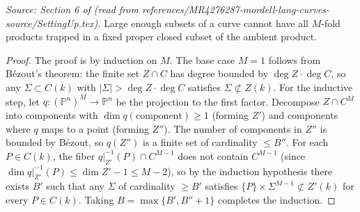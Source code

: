 \begin{lemma}
  \label{lem:NAlon}
  \textit{Source: Section 6 of \cite{MR4276287-mordell-lang-curves} (read from references/MR4276287-mordell-lang-curves-source/SettingUp.tex).}
  Large enough subsets of a curve cannot have all \(M\)-fold products trapped in
  a fixed proper closed subset of the ambient product.
\end{lemma}

\begin{proof}
  The proof is by induction on \(M\). The base case \(M = 1\) follows from Bézout's theorem:
  the finite set \(Z \cap C\) has degree bounded by \(\deg Z \cdot \deg C\), so any
  \(\Sigma \subset C(k)\) with \(|\Sigma| > \deg Z \cdot \deg C\) satisfies
  \(\Sigma \not\subset Z(k)\).
  For the inductive step, let \(q \colon (\mathbb{P}^n)^M \to \mathbb{P}^n\)
  be the projection to the first factor.
  Decompose \(Z \cap C^M\) into components with \(\dim q(\text{component}) \ge 1\)
  (forming \(Z'\)) and components where \(q\) maps to a point (forming \(Z''\)).
  The number of components in \(Z''\) is bounded by Bézout, so \(q(Z'')\) is a finite
  set of cardinality \(\le B''\).
  For each \(P \in C(k)\), the fiber \(q|_{Z'}^{-1}(P) \cap C^{M-1}\) does not contain
  \(C^{M-1}\) (since \(\dim q|_{Z'}^{-1}(P) \le \dim Z' - 1 \le M - 2\)),
  so by the induction hypothesis there exists \(B'\) such that any
  \(\Sigma\) of cardinality \(\ge B'\) satisfies
  \(\{P\} \times \Sigma^{M-1} \not\subset Z'(k)\) for every \(P \in C(k)\).
  Taking \(B = \max\{B', B'' + 1\}\) completes the induction.
\end{proof}

